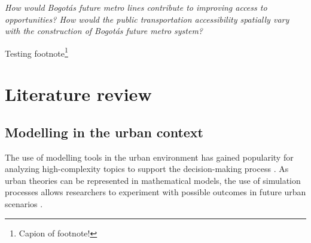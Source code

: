 \documentclass[12pt, a4paper]{report}
\begin{document}



\begin{center}
    \textit{How would Bogot\'{a}\textquotesingle s future metro lines contribute to improving access to opportunities? How would the public transportation accessibility spatially vary with the construction of Bogot\'{a}\textquotesingle s future metro system?}
\end{center}




Testing footnote\footnote{Capion of footnote!}


\chapter{Literature review} \label{Chap2}

\section{Modelling in the urban context}

The use of modelling tools in the urban environment has gained popularity for analyzing high-complexity topics to support the decision-making process \citep{houApproachBuildingOccupancy2020}. As urban theories can be represented in mathematical models, the use of simulation processes allows researchers to experiment with possible outcomes in future urban scenarios \citep{battyUrbanModeling2009a}.
\end{document}
